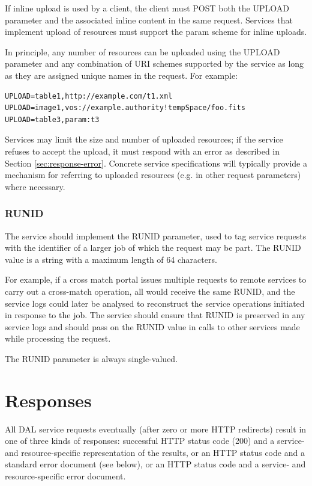 \documentclass[11pt,letter]{ivoa}
\begin{document}
If inline upload is used by a client, the client must POST both the UPLOAD
parameter and the associated inline content in the same request. Services that
implement upload of resources must support the param scheme for inline uploads.

In principle, any number of resources can be uploaded using the UPLOAD parameter
and any combination of URI schemes supported by the service as long as they are
assigned unique names in the request. For example:

\begin{verbatim}
UPLOAD=table1,http://example.com/t1.xml
UPLOAD=image1,vos://example.authority!tempSpace/foo.fits
UPLOAD=table3,param:t3
\end{verbatim}

Services may limit the size and number of uploaded resources; if the service
refuses to accept the upload, it must respond with an error as described in
Section \ref{sec:response-error}. Concrete service specifications will
typically provide a mechanism for referring to uploaded resources (e.g. in
other request parameters) where necessary.

\subsubsection{RUNID}
\label{sec:RUNID}
The service should implement the RUNID parameter, used to tag service requests
with the identifier of a larger job of which the request may be part. The RUNID
value is a string with a maximum length of 64 characters.

For example, if a cross match portal issues multiple requests to remote services
to carry out a cross-match operation, all would receive the same RUNID, and the
service logs could later be analysed to reconstruct the service operations
initiated in response to the job. The service should ensure that RUNID is
preserved in any service logs and  should pass on the RUNID value in calls to
other services made while processing the request.

The RUNID parameter is always single-valued.

\section{Responses}
\label{sec:responses}
All DAL service requests eventually (after zero or more HTTP redirects) result
in one of three kinds of responses:
successful HTTP status code (200) and a service- and resource-specific
representation of the results, or an HTTP status code and a standard error
document (see below), or an HTTP status code and a service- and
resource-specific error document.
\end{document}
